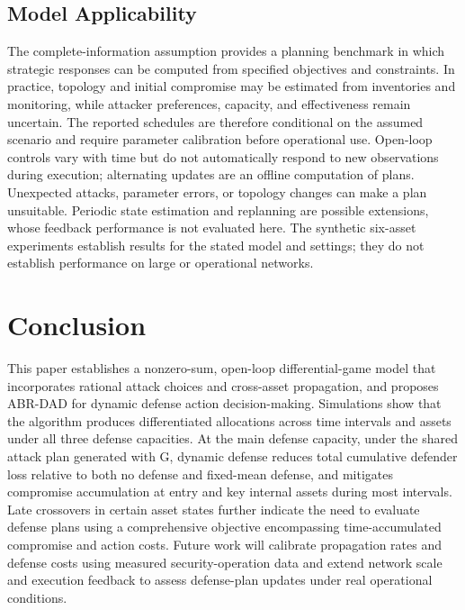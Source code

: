 \documentclass[conference,letterpaper]{IEEEtran}
\begin{document}
\subsection{Model Applicability}
The complete-information assumption provides a planning benchmark in which strategic responses can be computed from specified objectives and constraints. In practice, topology and initial compromise may be estimated from inventories and monitoring, while attacker preferences, capacity, and effectiveness remain uncertain. The reported schedules are therefore conditional on the assumed scenario and require parameter calibration before operational use. Open-loop controls vary with time but do not automatically respond to new observations during execution; alternating updates are an offline computation of plans. Unexpected attacks, parameter errors, or topology changes can make a plan unsuitable. Periodic state estimation and replanning are possible extensions, whose feedback performance is not evaluated here. The synthetic six-asset experiments establish results for the stated model and settings; they do not establish performance on large or operational networks.

\section{Conclusion}
This paper establishes a nonzero-sum, open-loop differential-game model that incorporates rational attack choices and cross-asset propagation, and proposes ABR-DAD for dynamic defense action decision-making. Simulations show that the algorithm produces differentiated allocations across time intervals and assets under all three defense capacities. At the main defense capacity, under the shared attack plan generated with G, dynamic defense reduces total cumulative defender loss relative to both no defense and fixed-mean defense, and mitigates compromise accumulation at entry and key internal assets during most intervals. Late crossovers in certain asset states further indicate the need to evaluate defense plans using a comprehensive objective encompassing time-accumulated compromise and action costs. Future work will calibrate propagation rates and defense costs using measured security-operation data and extend network scale and execution feedback to assess defense-plan updates under real operational conditions.
\end{document}
